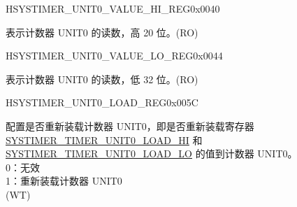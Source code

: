 \begin{register}{H}{SYSTIMER\_UNIT0\_VALUE\_HI\_REG}{0x0040}\label{regdesc:SYSTIMERUNIT0VALUEHIREG}
%
%
\regnewline%
\begin{regdesc}\begin{reglist}
\label{fielddesc:SYSTIMERTIMERUNIT0VALUEHI}\item [SYSTIMER\_TIMER\_UNIT0\_VALUE\_HI] 表示计数器 UNIT0 的读数，高 20 位。(RO)
\end{reglist}\end{regdesc}
\end{register}


\begin{register}{H}{SYSTIMER\_UNIT0\_VALUE\_LO\_REG}{0x0044}\label{regdesc:SYSTIMERUNIT0VALUELOREG}
%
\regnewline%
\begin{regdesc}\begin{reglist}
\label{fielddesc:SYSTIMERTIMERUNIT0VALUELO}\item [SYSTIMER\_TIMER\_UNIT0\_VALUE\_LO] 表示计数器 UNIT0 的读数，低 32 位。(RO)
\end{reglist}\end{regdesc}
\end{register}


\begin{register}{H}{SYSTIMER\_UNIT0\_LOAD\_REG}{0x005C}\label{regdesc:SYSTIMERUNIT0LOADREG}
%
%
\regnewline%
\begin{regdesc}\begin{reglist}
\label{fielddesc:SYSTIMERTIMERUNIT0LOAD}\item [SYSTIMER\_TIMER\_UNIT0\_LOAD] 配置是否重新装载计数器 UNIT0，即是否重新装载寄存器 \hyperref[fielddesc:SYSTIMERTIMERUNIT0LOADHI]{SYSTIMER\_TIMER\_UNIT0\_LOAD\_HI} 和 \hyperref[fielddesc:SYSTIMERTIMERUNIT0LOADLO]{SYSTIMER\_TIMER\_UNIT0\_LOAD\_LO} 的值到计数器 UNIT0。\\
0：无效 \\
1：重新装载计数器 UNIT0\\
(WT)
\end{reglist}\end{regdesc}
\end{register}


